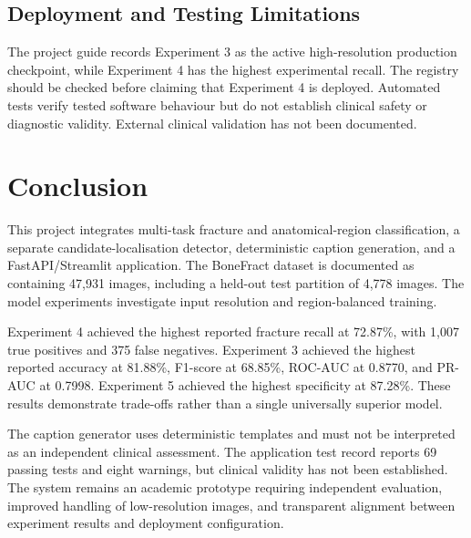 \documentclass{article}
\begin{document}
\subsection{Deployment and Testing Limitations}
The project guide records Experiment 3 as the active high-resolution production checkpoint, while Experiment 4 has the highest experimental recall. The registry should be checked before claiming that Experiment 4 is deployed. Automated tests verify tested software behaviour but do not establish clinical safety or diagnostic validity. External clinical validation has not been documented.

\section{Conclusion}
This project integrates multi-task fracture and anatomical-region classification, a separate candidate-localisation detector, deterministic caption generation, and a FastAPI/Streamlit application. The BoneFract dataset is documented as containing 47,931 images, including a held-out test partition of 4,778 images. The model experiments investigate input resolution and region-balanced training.

Experiment 4 achieved the highest reported fracture recall at 72.87\%, with 1,007 true positives and 375 false negatives. Experiment 3 achieved the highest reported accuracy at 81.88\%, F1-score at 68.85\%, ROC-AUC at 0.8770, and PR-AUC at 0.7998. Experiment 5 achieved the highest specificity at 87.28\%. These results demonstrate trade-offs rather than a single universally superior model.

The caption generator uses deterministic templates and must not be interpreted as an independent clinical assessment. The application test record reports 69 passing tests and eight warnings, but clinical validity has not been established. The system remains an academic prototype requiring independent evaluation, improved handling of low-resolution images, and transparent alignment between experiment results and deployment configuration.

\end{document}
